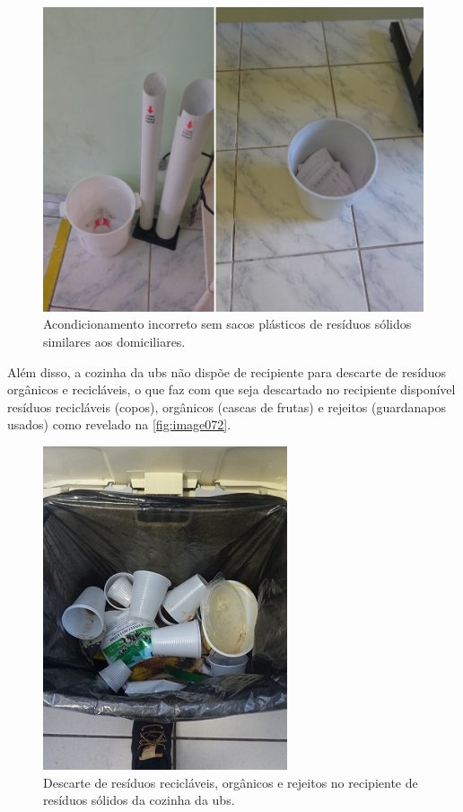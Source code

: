 	
	\begin{figure}
		\centering
		\includegraphics[width=0.75\linewidth]{produtos/prodtres/image070_71}
		\caption{Acondicionamento incorreto sem sacos plásticos de resíduos sólidos similares aos domiciliares.}
		\label{fig:image070_71}
	\end{figure}


	Além disso, a cozinha da \gls{ubs} não dispõe de recipiente para descarte de resíduos orgânicos e recicláveis, o que faz com que seja descartado no recipiente disponível resíduos recicláveis (copos), orgânicos (cascas de frutas) e rejeitos (guardanapos usados) como revelado na \autoref{fig:image072}. 
	
	\begin{figure}
		\centering
		\includegraphics[width=0.40\linewidth]{produtos/prodtres/image072}
		\caption{Descarte de resíduos recicláveis, orgânicos e rejeitos no recipiente de resíduos sólidos da cozinha da \gls{ubs}.}
		\label{fig:image072}
	\end{figure}
	
